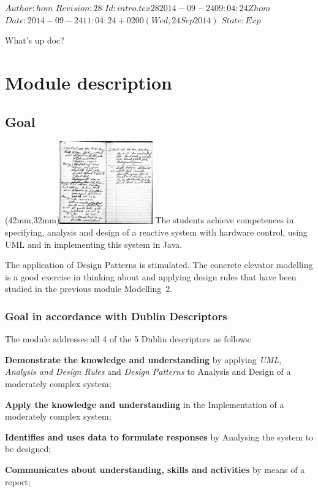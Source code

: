\renewcommand\TheFile{intro.tex}
\SVN $Author: hom $
\SVN $Revision: 28 $
\SVN $Id: intro.tex 28 2014-09-24 09:04:24Z hom $
\SVN $Date: 2014-09-24 11:04:24 +0200 (Wed, 24 Sep 2014) $
\SVN $State: Exp $

\begin{savequote}[8cm]
  \sffamily
  What's up doc?
\end{savequote}
\chapter{Module description}
\section{Goal}
\parpic(42mm,32mm){\includegraphics[width=40mm]{figures/INT082E06-description4.jpg}}
The students achieve competences in specifying, analysis and design of
a reactive system with hardware control, using UML and in implementing
this system in Java.

The application of Design Patterns is stimulated. The concrete
elevator modelling is a good exercise in thinking about and applying
design rules that have been studied in the previous module Modelling~2.

\subsection{Goal in accordance with Dublin Descriptors}
The module addresses all 4 of the 5 Dublin descriptors as follows:
\begin{Itemize}
\item \textbf{Demonstrate the knowledge and understanding} by applying
  \textit{UML}, \textit{Analysis and Design Rules} and \textit{Design
    Patterns} to Analysis and Design of a moderately complex system; 
\item \textbf{Apply the knowledge and understanding} in the
    Implementation of a moderately complex system;
  \item \textbf{Identifies and uses data to formulate responses} by
    Analysing the system to be designed;
  \item \textbf{Communicates about understanding, skills and
      activities} by means of a report;
\end{Itemize}

